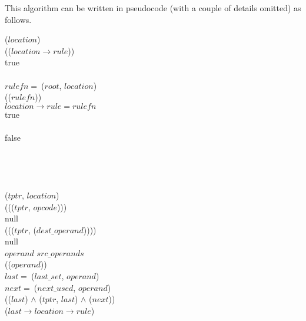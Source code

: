 This algorithm can be written in pseudocode (with a couple of details omitted) as follows.

\begin{tabbing}
 ($location$)\\
\startblk
   (($location \rightarrow rule$))\\
  \startblk
     true\\
  \stopblk
  \\
  \startblk
    $rulefn =\ $($root$, $location$)\\
     (($rulefn$))\\
    \startblk
      $location \rightarrow rule = rulefn$\\
       true\\
    \stopblk
    \\
    \startblk
       false\\
    \stopblk
    \\
  \stopblk
  \\
\stopblk
{}\\
\\
 ($tptr$, $location$)\\
\startblk
   ((($tptr$, $opcode$)))\\
  \startblk
     null\\
  \stopblk
   ((($tptr$, ($dest\_operand$))))\\
  \startblk
     null\\
  \stopblk
   $operand$  $src\_operands$\\
  \startblk
     (($operand$))\\
    \startblk
      $last =\ $($last\_set$, $operand$)\\
      $next =\ $($next\_used$, $operand$)\\
       (($last$) $\wedge$ ($tptr$, $last$) $\wedge$ ($next$))\\
      \startblk
        ($last \rightarrow location \rightarrow rule$)\\
      \stopblk
      \\

\end{tabbing}
